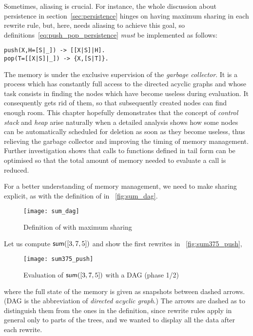 Sometimes, aliasing is crucial. For instance, the whole discussion
about persistence in section~\ref{sec:persistence} hinges on having
maximum sharing in each rewrite rule, but, here, \Erlang needs
aliasing to achieve this goal, so
definitions~\eqref{eq:push_pop_persistence}
 \emph{must} be implemented as
follows:
\begin{verbatim}
push(X,H=[S|_]) -> [[X|S]|H].
pop(T=[[X|S]|_]) -> {X,[S|T]}.
\end{verbatim}


The memory is under the exclusive supervision of the \emph{garbage collector}. It is a process which has constantly full access to the directed acyclic graphs and whose task consists in finding the nodes which have become useless during evaluation. It consequently gets rid of them, so that subsequently created nodes can find enough room. This chapter hopefully demonstrates that the concept of \emph{control stack} and \emph{heap} arise naturally when a detailed analysis shows how some nodes can be automatically scheduled for deletion as soon as they become useless, thus relieving the garbage collector and improving the timing of memory management. Further investigation shows that calls to functions defined in tail form can be optimised so that the total amount of memory needed to evaluate a call is reduced.

For a better understanding of memory management, we need to make
sharing explicit, as with the definition of  in
\fig~\vref{fig:sum_dag}.
\begin{figure}
\centering
\texttt{[image: sum\_dag]}%
\caption{Definition of  with maximum sharing
\label{fig:sum_dag}}
\end{figure}
Let us compute \(\textsf{sum}([3,7,5])\) and show the first rewrites in
\fig~\vref{fig:sum375_push},
\begin{figure}[b]
\centering
\texttt{[image: sum375\_push]}
\caption{Evaluation of \(\textsf{sum}([3,7,5])\) with a DAG (phase 1/2)
\label{fig:sum375_push}}
\end{figure}
where the full state of the memory is given as snapshots between
dashed arrows. (DAG is the abbreviation of \emph{directed acyclic
  graph}.)  The arrows are dashed as to distinguish them from the ones in the definition, since rewrite rules apply in general only to parts of the trees, and we wanted to display all the data after each rewrite.

